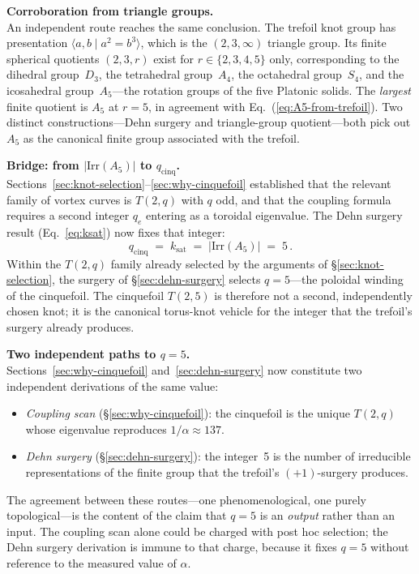 \documentclass[11pt]{article}
\begin{document}
\medskip
\noindent\textbf{Corroboration from triangle groups.}\\
An independent route reaches the same conclusion.  The trefoil
knot group has presentation
$\langle a, b \mid a^2 = b^3 \rangle$, which is the
$(2,3,\infty)$ triangle group.  Its finite spherical quotients
$(2,3,r)$ exist for $r \in \{2,3,4,5\}$ only, corresponding to
the dihedral group~$D_3$, the tetrahedral group~$A_4$, the
octahedral group~$S_4$, and the icosahedral group~$A_5$---the
rotation groups of the five Platonic solids.  The
\emph{largest} finite quotient is $A_5$ at $r = 5$, in
agreement with Eq.~(\ref{eq:A5-from-trefoil}).  Two distinct
constructions---Dehn surgery and triangle-group quotient---both
pick out $A_5$ as the canonical finite group associated with the
trefoil.

\medskip
\noindent\textbf{Bridge: from $|\mathrm{Irr}(A_5)|$ to
$q_\text{cinq}$.}\\
Sections~\ref{sec:knot-selection}--\ref{sec:why-cinquefoil}
established that the relevant family of vortex curves is $T(2,q)$
with $q$ odd, and that the coupling formula requires a second
integer $q_e$ entering as a toroidal eigenvalue.  The Dehn
surgery result (Eq.~\ref{eq:ksat}) now fixes that integer:
\begin{equation}
  q_\text{cinq} \;=\; k_\text{sat} \;=\; |\mathrm{Irr}(A_5)| \;=\; 5\,.
\end{equation}
Within the $T(2,q)$ family already selected by the arguments of
\S\ref{sec:knot-selection}, the surgery of \S\ref{sec:dehn-surgery}
selects $q = 5$---the poloidal winding of the cinquefoil.  The
cinquefoil $T(2,5)$ is therefore not a second, independently
chosen knot; it is the canonical torus-knot vehicle for the
integer that the trefoil's surgery already produces.

\medskip
\noindent\textbf{Two independent paths to $q = 5$.}\\
Sections~\ref{sec:why-cinquefoil} and~\ref{sec:dehn-surgery} now
constitute two independent derivations of the same value:
\begin{itemize}\setlength\itemsep{0pt}
  \item \emph{Coupling scan} (\S\ref{sec:why-cinquefoil}): the
    cinquefoil is the unique $T(2,q)$ whose eigenvalue reproduces
    $1/\alpha \approx 137$.
  \item \emph{Dehn surgery} (\S\ref{sec:dehn-surgery}): the
    integer~5 is the number of irreducible representations of the
    finite group that the trefoil's $(+1)$-surgery produces.
\end{itemize}
The agreement between these routes---one phenomenological, one
purely topological---is the content of the claim that $q = 5$ is
an \emph{output} rather than an input.  The coupling scan alone
could be charged with post hoc selection; the Dehn surgery
derivation is immune to that charge, because it fixes $q = 5$
without reference to the measured value of $\alpha$.
\end{document}
